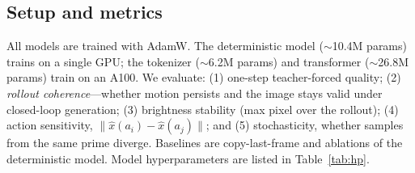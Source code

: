 \documentclass[10pt,twocolumn,letterpaper]{article}
\begin{document}
\subsection{Setup and metrics}
All models are trained with AdamW. The deterministic model ($\sim$10.4M params)
trains on a single GPU; the tokenizer ($\sim$6.2M params) and transformer
($\sim$26.8M params) train on an A100. We evaluate: (1) one-step teacher-forced
quality; (2) \emph{rollout coherence}---whether motion persists and the image
stays valid under closed-loop generation; (3) brightness stability (max pixel
over the rollout); (4) action sensitivity, $\|\hat{x}(a_i)-\hat{x}(a_j)\|$; and
(5) stochasticity, whether samples from the same prime diverge. Baselines are
copy-last-frame and ablations of the deterministic model. Model hyperparameters
are listed in Table~\ref{tab:hp}.
\end{document}
